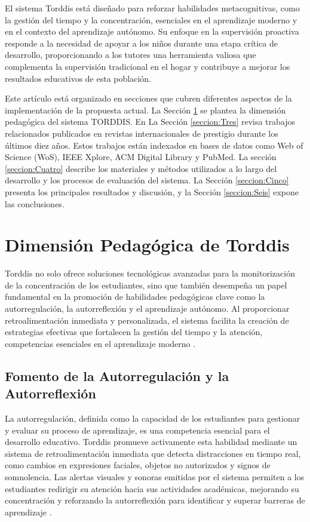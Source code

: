 \documentclass[a4paper,fleqn]{cas-sc}
\begin{document}
		El sistema Torddis está diseñado para reforzar habilidades metacognitivas, como la gestión del tiempo y la concentración, esenciales en el aprendizaje moderno y en el contexto del aprendizaje autónomo. Su enfoque en la supervisión proactiva responde a la necesidad de apoyar a los niños durante una etapa crítica de desarrollo, proporcionando a los tutores una herramienta valiosa que complementa la supervisión tradicional en el hogar y contribuye a mejorar los resultados educativos de esta población.
		
		Este artículo está organizado en secciones que cubren diferentes aspectos de la implementación de la propuesta actual. La Sección \ref{seccion:Dos} se plantea la dimensión pedagógica del sistema TORDDIS. En La Sección \ref{seccion:Tres} revisa trabajos relacionados publicados en revistas internacionales de prestigio durante los últimos diez años. Estos trabajos están indexados en bases de datos como Web of Science (WoS), IEEE Xplore, ACM Digital Library y PubMed. La sección \ref{seccion:Cuatro} describe los materiales y métodos utilizados a lo largo del desarrollo y los procesos de evaluación del sistema. La Sección \ref{seccion:Cinco} presenta los principales resultados y discusión, y la Sección \ref{seccion:Seis} expone las conclusiones.
		
	\section{Dimensión Pedagógica de Torddis}
	\label{seccion:Dos}
	
		Torddis no solo ofrece soluciones tecnológicas avanzadas para la monitorización de la concentración de los estudiantes, sino que también desempeña un papel fundamental en la promoción de habilidades pedagógicas clave como la autorregulación, la autorreflexión y el aprendizaje autónomo. Al proporcionar retroalimentación inmediata y personalizada, el sistema facilita la creación de estrategias efectivas que fortalecen la gestión del tiempo y la atención, competencias esenciales en el aprendizaje moderno \citep{Loh2025Plugging}.
		
		\subsection{Fomento de la Autorregulación y la Autorreflexión}
			La autorregulación, definida como la capacidad de los estudiantes para gestionar y evaluar su proceso de aprendizaje, es una competencia esencial para el desarrollo educativo. Torddis promueve activamente esta habilidad mediante un sistema de retroalimentación inmediata que detecta distracciones en tiempo real, como cambios en expresiones faciales, objetos no autorizados y signos de somnolencia. Las alertas visuales y sonoras emitidas por el sistema permiten a los estudiantes redirigir su atención hacia sus actividades académicas, mejorando su concentración y reforzando la autorreflexión para identificar y superar barreras de aprendizaje \citep{Ackermans2025Young,Li2024Systematic}.
		
\end{document}
